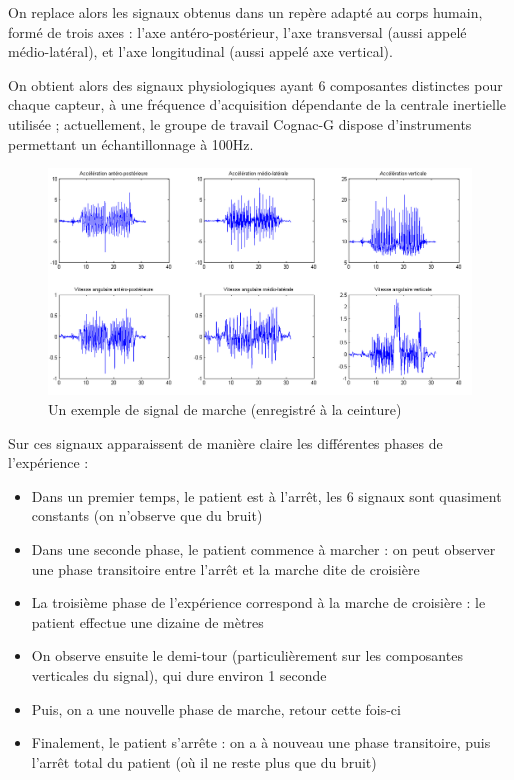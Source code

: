 \documentclass[french,11pt,notitlepage]{report}
\begin{document}
	On replace alors les signaux obtenus dans un repère adapté au corps humain, formé de trois axes :
	l'axe antéro-postérieur, l'axe transversal (aussi appelé médio-latéral), et l'axe longitudinal (aussi appelé axe vertical).
		
	\vspace{1pc}
	
	On obtient alors des signaux physiologiques ayant 6 composantes distinctes pour chaque capteur,
	à une fréquence d'acquisition dépendante de la centrale inertielle utilisée ;
	actuellement, le groupe de travail Cognac-G dispose d'instruments permettant un échantillonnage à 100Hz.

	
	\begin{figure}[!h]
		\includegraphics[scale=0.5]{ex_signal_back.png}
		\caption{Un exemple de signal de marche (enregistré à la ceinture)}
		\label{ex_signal_back}
	\end{figure}
	
	Sur ces signaux apparaissent de manière claire les différentes phases de l'expérience :
	\begin{itemize}
		\item Dans un premier temps, le patient est à l'arrêt, les 6 signaux sont quasiment constants (on n'observe que du bruit)
		\item Dans une seconde phase, le patient commence à marcher :
		on peut observer une phase transitoire entre l'arrêt et la marche dite de croisière
		\item La troisième phase de l'expérience correspond à la marche de croisière :
		le patient effectue une dizaine de mètres
		\item On observe ensuite le demi-tour (particulièrement sur les composantes verticales du signal), qui dure environ 1 seconde
		\item Puis, on a une nouvelle phase de marche, retour cette fois-ci
		\item Finalement, le patient s'arrête :
		on a à nouveau une phase transitoire, puis l'arrêt total du patient (où il ne reste plus que du bruit)
	\end{itemize}
	
\end{document}
